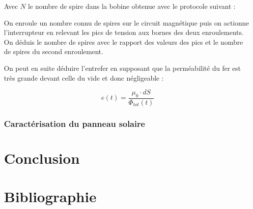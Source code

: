 \documentclass{rapportENS}
\begin{document}
 Avec $N$ le nombre de spire dans la bobine obtenue avec le protocole suivant :
 
On enroule un nombre connu de spires sur le circuit magnétique puis on actionne l'interrupteur en relevant les pics de tension aux bornes des deux enroulements. On déduis le nombre de spires avec le rapport des valeurs des pics et le nombre de spires du second enroulement.

On peut en suite déduire l'entrefer en supposant que la perméabilité du fer est très grande devant celle du vide et donc négligeable :

 \begin{equation}
 e(t) = \frac{\mu_0 \cdot dS}{\Phi_{tot}(t)}
 \end{equation}
 
 \section{Caractérisation du panneau solaire}
 
 \part{Conclusion}
 
 \part{Bibliographie}
\end{document}
